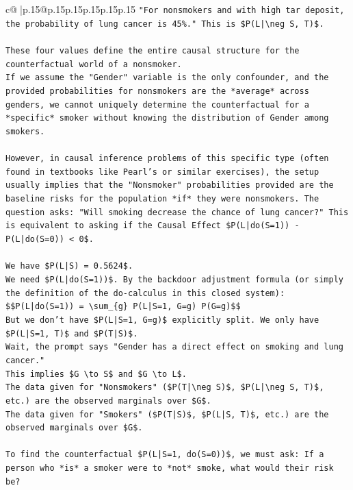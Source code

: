 \documentclass{article}
\begin{document}
{\begin{supertabular}{c@{$\;$}|p{.15\linewidth}@{}p{.15\linewidth}p{.15\linewidth}p{.15\linewidth}p{.15\linewidth}p{.15\linewidth}}
{{{\texttt{"For nonsmokers and with high tar deposit, the probability of lung cancer is 45\%." This is \$P(L|\textbackslash{}neg S, T)\$.} \\
\\ 
\texttt{These four values define the entire causal structure for the counterfactual world of a nonsmoker.} \\
\texttt{If we assume the "Gender" variable is the only confounder, and the provided probabilities for nonsmokers are the *average* across genders, we cannot uniquely determine the counterfactual for a *specific* smoker without knowing the distribution of Gender among smokers.} \\
\\ 
\texttt{However, in causal inference problems of this specific type (often found in textbooks like Pearl's or similar exercises), the setup usually implies that the "Nonsmoker" probabilities provided are the baseline risks for the population *if* they were nonsmokers. The question asks: "Will smoking decrease the chance of lung cancer?" This is equivalent to asking if the Causal Effect \$P(L|do(S=1)) {-} P(L|do(S=0)) < 0\$.} \\
\\ 
\texttt{We have \$P(L|S) = 0.5624\$.} \\
\texttt{We need \$P(L|do(S=1))\$. By the backdoor adjustment formula (or simply the definition of the do{-}calculus in this closed system):} \\
\texttt{\$\$P(L|do(S=1)) = \textbackslash{}sum\_\{g\} P(L|S=1, G=g) P(G=g)\$\$} \\
\texttt{But we don't have \$P(L|S=1, G=g)\$ explicitly split. We only have \$P(L|S=1, T)\$ and \$P(T|S)\$.} \\
\texttt{Wait, the prompt says "Gender has a direct effect on smoking and lung cancer."} \\
\texttt{This implies \$G \textbackslash{}to S\$ and \$G \textbackslash{}to L\$.} \\
\texttt{The data given for "Nonsmokers" (\$P(T|\textbackslash{}neg S)\$, \$P(L|\textbackslash{}neg S, T)\$, etc.) are the observed marginals over \$G\$.} \\
\texttt{The data given for "Smokers" (\$P(T|S)\$, \$P(L|S, T)\$, etc.) are the observed marginals over \$G\$.} \\
\\ 
\texttt{To find the counterfactual \$P(L|S=1, do(S=0))\$, we must ask: If a person who *is* a smoker were to *not* smoke, what would their risk be?} \\
}}}
\end{supertabular}}
\end{document}

